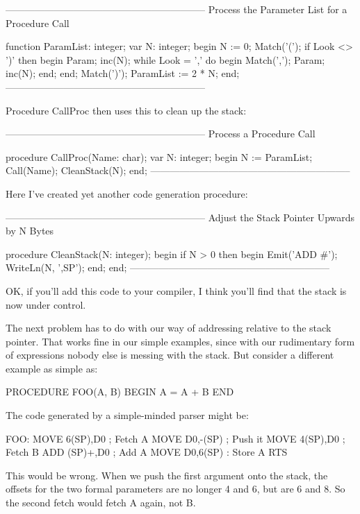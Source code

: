 \documentclass[float=false, crop=false]{standalone}
\begin{document}
{--------------------------------------------------------------}
{ Process the Parameter List for a Procedure  Call }

function ParamList: integer;
var N: integer;
begin
     N := 0;
     Match('(');
     if Look <> ')' then begin
          Param;
          inc(N);
          while Look = ',' do begin
               Match(',');
               Param;
               inc(N);
          end;
     end;
     Match(')');
     ParamList := 2 * N;
end;
{--------------------------------------------------------------}


Procedure CallProc then uses this to clean up the stack:


{--------------------------------------------------------------}
{ Process a Procedure Call }

procedure CallProc(Name: char);
var N: integer;
begin
     N := ParamList;
     Call(Name);
     CleanStack(N);
end;
{--------------------------------------------------------------}


Here I've created yet another code generation procedure:


{--------------------------------------------------------------}
{ Adjust the Stack Pointer Upwards by N Bytes }

procedure CleanStack(N: integer);
begin
     if N > 0 then begin
          Emit('ADD #');
          WriteLn(N, ',SP');
     end;
end;
{--------------------------------------------------------------}


OK, if you'll add this code to your compiler, I think you'll find that the stack
is now under control.

The next problem has to do with our way of addressing relative to the stack
pointer. That works fine in our simple examples, since with our rudimentary form
of expressions nobody else is messing with the stack. But consider a different
example as simple as:


     PROCEDURE FOO(A, B)
     BEGIN
          A = A + B
     END


The code generated by a simple-minded parser might be:


     FOO: MOVE 6(SP),D0       ; Fetch A
          MOVE D0,-(SP)       ; Push it
          MOVE 4(SP),D0       ; Fetch B
          ADD (SP)+,D0        ; Add A
          MOVE D0,6(SP)       : Store A
          RTS


This would be wrong. When we push the first argument onto the stack, the offsets
for the two formal parameters are no longer 4 and 6, but are 6 and 8. So the
second fetch would fetch A again, not B.
\end{document}
